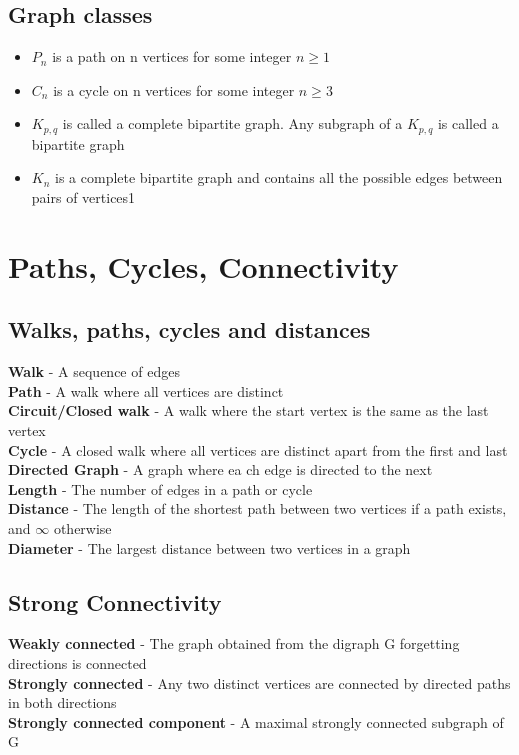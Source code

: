 \documentclass{article}[18pt]
\begin{document}
\subsection{Graph classes}
\begin{itemize}
	\item $P_n$ is a path on n vertices for some integer $n\geqslant 1$
	\item $C_n$ is a cycle on n vertices for some integer $n\geqslant 3$
	\item $K_{p,q}$ is called a complete bipartite graph. Any subgraph of a $K_{p,q}$ is called a bipartite graph
	\item $K_n$ is a complete bipartite graph and contains all the possible edges between pairs of vertices1
\end{itemize}
\section{Paths, Cycles, Connectivity}
\subsection{Walks, paths, cycles and distances}
\textbf{Walk} - A sequence of edges \\
\textbf{Path} - A walk where all vertices are distinct\\
\textbf{Circuit/Closed walk} - A walk where the start vertex is the same as the last vertex\\
\textbf{Cycle} - A closed walk where all vertices are distinct apart from the first and last\\
\textbf{Directed Graph} - A graph where ea ch edge is directed to the next\\
\textbf{Length} - The number of edges in a path or cycle\\
\textbf{Distance} - The length of the shortest path between two vertices if a path exists, and $\infty$ otherwise\\
\textbf{Diameter} - The largest distance between two vertices in a graph
\subsection{Strong Connectivity}
\textbf{Weakly connected} - The graph obtained from the digraph G forgetting directions is connected\\
\textbf{Strongly connected} - Any two distinct vertices are connected by directed paths in both directions\\
\textbf{Strongly connected component} - A maximal strongly connected subgraph of G
\end{document}
